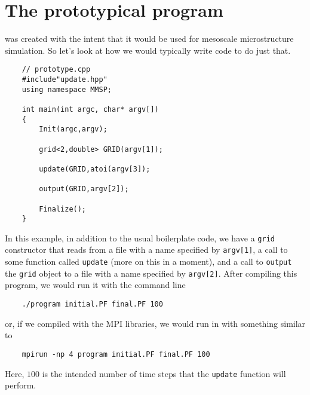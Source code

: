 \section{The prototypical \MMSP program}
\MMSP was created with the intent that it would be used for mesoscale microstructure simulation.  So let's look at how we would typically write code to do just that.
\begin{shadebox}
\begin{verbatim}
    // prototype.cpp
    #include"update.hpp"
    using namespace MMSP;

    int main(int argc, char* argv[])
    {
        Init(argc,argv);

        grid<2,double> GRID(argv[1]);

        update(GRID,atoi(argv[3]);

        output(GRID,argv[2]);

        Finalize();
    }
\end{verbatim}
\end{shadebox}
In this example, in addition to the usual \MMSP boilerplate code, we have a {\tt grid} constructor that reads from a file with a name specified by {\tt argv[1]}, a call to some function called {\tt update} (more on this in a moment), and a call to {\tt output} the {\tt grid} object to a file with a name specified by {\tt argv[2]}. After compiling this program, we would run it with the command line
\begin{shadebox}
\begin{verbatim}
    ./program initial.PF final.PF 100
\end{verbatim}
\end{shadebox}
or, if we compiled with the MPI libraries, we would run in with something similar to
\begin{shadebox}
\begin{verbatim}
    mpirun -np 4 program initial.PF final.PF 100
\end{verbatim}
\end{shadebox}
Here, $100$ is the intended number of time steps that the {\tt update} function will perform.

